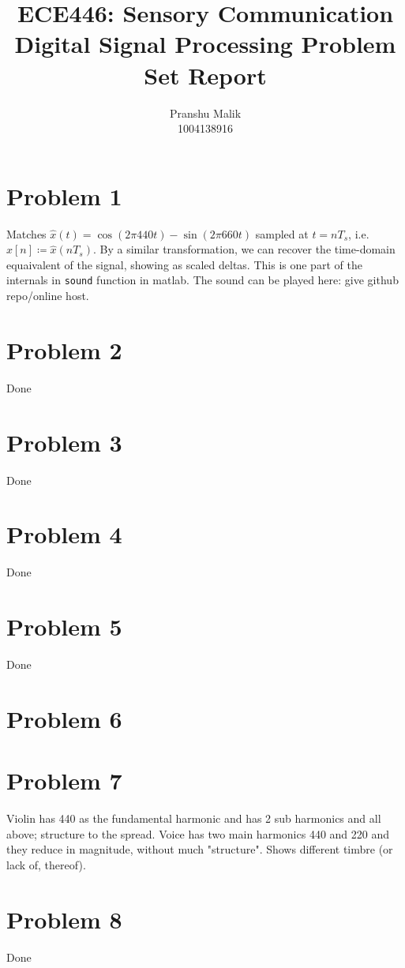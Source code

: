 \documentclass[10pt]{article}
\date{}
\begin{document}
\title{\textbf{\Large{\textsc{ECE446:} Sensory Communication}} \\ \Large{Digital Signal Processing Problem Set Report}\vspace{-0.3cm}}
\author{Pranshu Malik\\ \footnotesize{1004138916}\vspace{-3cm}}

\maketitle

\section{Problem 1}
Matches $\hat{x}(t) = \cos(2\pi440t) - \sin(2\pi660t)$ sampled at $t = nT_s$, i.e. $\hat{x}[n] \coloneqq \hat{x}(nT_s)$. By a similar transformation, we can recover the time-domain equaivalent of the signal, showing as scaled deltas. This is one part of the internals in \texttt{sound} function in matlab. The sound can be played here: give github repo/online host.

\section{Problem 2}
Done

\section{Problem 3}
Done
\section{Problem 4}
Done
\section{Problem 5}
Done
\section{Problem 6}
\section{Problem 7}
Violin has 440 as the fundamental harmonic and has 2 sub harmonics and all above; structure to the spread. Voice has two main harmonics 440 and 220 and they reduce in magnitude, without much "structure". Shows different timbre (or lack of, thereof).
\section{Problem 8}
Done
\end{document}
